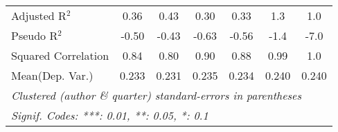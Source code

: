 \begin{tabular}{lcccccc}
   Adjusted R$^2$                                             & 0.36          & 0.43          & 0.30      & 0.33     & 1.3     & 1.0\\  
   Pseudo R$^2$                                               & -0.50         & -0.43         & -0.63     & -0.56    & -1.4    & -7.0\\  
   Squared Correlation                                        & 0.84          & 0.80          & 0.90      & 0.88     & 0.99    & 1.0\\  
Mean(Dep. Var.) & 0.233 & 0.231 & 0.235 & 0.234 & 0.240 & 0.240 \\
   \midrule \midrule
   \multicolumn{7}{l}{\emph{Clustered (author \& quarter) standard-errors in parentheses}}\\
   \multicolumn{7}{l}{\emph{Signif. Codes: ***: 0.01, **: 0.05, *: 0.1}}\\
\end{tabular}
\par\endgroup
